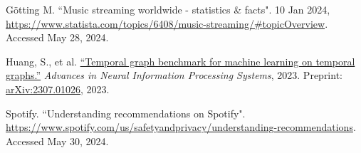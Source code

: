 \documentclass[10pt, letterpaper]{article}
\renewcommand{\section}[1]{%
	    \vspace{\parskip}
		{\large \uppercase{#1}}
}
\begin{document}
\begingroup

\renewcommand{\section}[2]{}%

\begin{thebibliography}{3}
\footnotesize	
{}
Götting M. 
``Music streaming worldwide - statistics \& facts". 10 Jan 2024, \url{https://www.statista.com/topics/6408/music-streaming/#topicOverview}. Accessed May 28, 2024. 
	
Huang, S., et al.
\href{https://doi.org/10.48550/arXiv.2307.01026}
{``Temporal graph benchmark for machine learning on temporal graphs.''} {\em Advances in Neural Information Processing Systems}, 2023. Preprint: \url{arXiv:2307.01026}, 2023.

Spotify. ``Understanding recommendations on Spotify".  \url{https://www.spotify.com/us/safetyandprivacy/understanding-recommendations}.  Accessed May 30, 2024. 
	
\end{thebibliography}

\endgroup	
	
\end{document}
